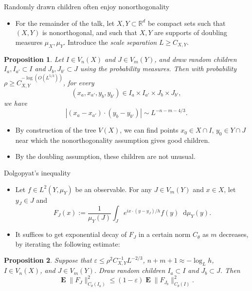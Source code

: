 \documentclass[10pt]{beamer}
\newcommand{\RR}{\mathbb{R}}
\newcommand*\dif{\mathop{}\!\mathrm{d}}
\DeclareMathOperator*{\Expect}{\mathbf E}
\newtheorem{proposition}{Proposition}
\begin{document}
\begin{frame}{Randomly drawn children often enjoy nonorthogonality}
\begin{itemize}
\item For the remainder of the talk, let $X, Y \subset \RR^d$ be compact sets such that $(X, Y)$ is nonorthogonal, and such that $X, Y$ are supports of doubling measures $\mu_X, \mu_Y$. Introduce the \emph{scale separation} $L \geq C_{X, Y}$. \pause
\end{itemize}

\begin{proposition}
Let $I \in V_n(X)$ and $J \in V_m(Y)$, and draw random children $I_a, I_{a'} \subset I$ and $J_b, J_{b'} \subset J$ using the probability measures.
Then with probability $\rho \geq C_{X, Y}^{-\log(O(L^{5/3}))}$, for every
$$(x_a, x_{a'}, y_b, y_{b'}) \in I_a \times I_{a'} \times J_b \times J_{b'},$$
we have
$$|(x_a - x_{a'}) \cdot (y_b - y_{b'})| \sim L^{-n-m-4/3}.$$
\end{proposition} \pause

\begin{itemize}
\item By construction of the tree $V(X)$, we can find points $x_0 \in X \cap I$, $y_0 \in Y \cap J$ near which the nonorthogonality assumption gives good children. \pause
\item By the doubling assumption, these children are not unusual.
\end{itemize}
\end{frame}

\begin{frame}{Dolgopyat's inequality}
\begin{itemize}
\item Let $f \in L^2(Y, \mu_Y)$ be an observable. For any $J \in V_m(Y)$ and $x \in X$, let $y_J \in J$ and 
$$F_J(x) := \frac{1}{\mu_Y(J)} \int_J e^{ix \cdot (y - y_J)/h} f(y) \dif \mu_Y(y).$$ \pause
\item It suffices to get exponential decay of $F_J$ in a certain norm $C_\theta$ as $m$ decreases, by iterating the following estimate: \pause
\end{itemize}

\begin{proposition}
Suppose that $\varepsilon \leq \rho^2 C_{X, Y}^{-1} L^{-2/3}$, $n + m + 1 \approx -\log_L h$, $I \in V_n(X)$, and $J \in V_m(Y)$.
Draw random children $I_a \subset I$ and $J_b \subset J$. Then 
$$\Expect \|F_J\|_{C_\theta(I_a)}^2 \leq (1 - \varepsilon) \Expect \|F_{J_b}\|_{C_\theta(I)}^2.$$
\end{proposition}
\end{frame}
\end{document}
